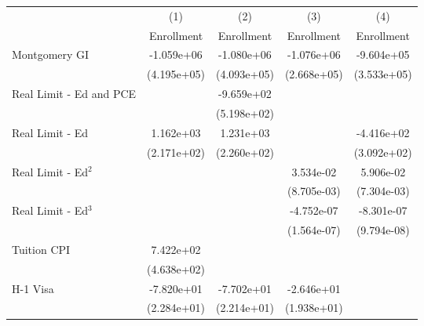 
\begin{tabular}{l*{4}{c}}
    \toprule
                             &\multicolumn{1}{c}{(1)}&\multicolumn{1}{c}{(2)}&\multicolumn{1}{c}{(3)}&\multicolumn{1}{c}{(4)}\\
                             &\multicolumn{1}{c}{Enrollment}&\multicolumn{1}{c}{Enrollment}&\multicolumn{1}{c}{Enrollment}&\multicolumn{1}{c}{Enrollment}\\
    \midrule
    Montgomery GI            &  -1.059e+06\sym{++}&  -1.080e+06\sym{++}&  -1.076e+06\sym{**}&  -9.604e+05\sym{++}\\
                             & (4.195e+05)        & (4.093e+05)        & (2.668e+05)        & (3.533e+05)        \\
    \addlinespace
    Real Limit - Ed and PCE  &                    &  -9.659e+02\sym{+} &                    &                    \\
                             &                    & (5.198e+02)        &                    &                    \\
    \addlinespace
    Real Limit - Ed          &   1.162e+03\sym{**}&   1.231e+03\sym{**}&                    &  -4.416e+02        \\
                             & (2.171e+02)        & (2.260e+02)        &                    & (3.092e+02)        \\
    \addlinespace
    Real Limit - Ed$^2$        &                    &                    &   3.534e-02\sym{**}&   5.906e-02\sym{**}\\
                             &                    &                    & (8.705e-03)        & (7.304e-03)        \\
    \addlinespace
    Real Limit - Ed$^3$        &                    &                    &  -4.752e-07\sym{*} &  -8.301e-07\sym{**}\\
                             &                    &                    & (1.564e-07)        & (9.794e-08)        \\
    \addlinespace
    Tuition CPI              &   7.422e+02        &                    &                    &                    \\
                             & (4.638e+02)        &                    &                    &                    \\
    \addlinespace
    H-1 Visa                 &  -7.820e+01\sym{*} &  -7.702e+01\sym{*} &  -2.646e+01        &                    \\
                             & (2.284e+01)        & (2.214e+01)        & (1.938e+01)        &                    \\

\end{tabular}
